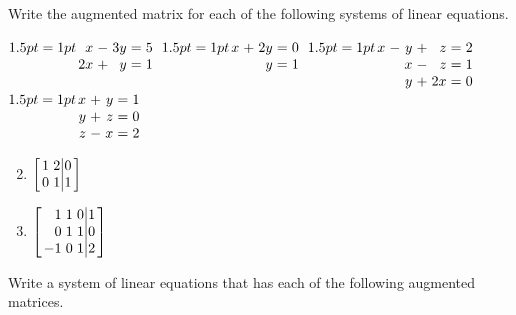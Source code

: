 \begin{multicols}{2}
\columnbreak
\begin{ex}
Write the augmented matrix for each of the following systems of linear equations.
\begin{exenumerate}
\exitem $\arraycolsep=1pt
\begin{array}[t]{rlrcr}
	x  & - & 3y & = & 5\\
	2x & + &  y & = & 1 
\end{array}$
\exitem $\arraycolsep=1pt
\begin{array}[t]{rlrcr}
	x & + & 2y & = & 0\\
	  &   &  y & = & 1
\end{array}$
\exitem $\arraycolsep=1pt
\begin{array}[t]{rlrlrcr}
	x & - & y & + & z & = & 2 \\
	  &   & x & - & z & = & 1 \\
	  &   & y & + &2x & = & 0
\end{array}$
\exitem $\arraycolsep=1pt
\begin{array}[t]{rlrcr}
	x & + & y & = & 1 \\
	y & + & z & = & 0 \\
	z & - & x & = & 2
\end{array}$
\end{exenumerate}
\begin{sol}
\begin{enumerate}[label={\alph*.}]
\setcounter{enumi}{1}
\item
$\leftB \begin{array}{rr|r}
	1 & 2 & 0 \\
	0 & 1 & 1
\end{array} \rightB$
\setcounter{enumi}{3}
\item $\leftB \begin{array}{rrr|r}
	1 & 1 & 0 & 1 \\
	0 & 1 & 1 & 0 \\
	-1 & 0 & 1 & 2
\end{array} \rightB$
\end{enumerate}
\end{sol}
\end{ex}

\begin{ex}
Write a system of linear equations that has each of the following augmented matrices.


\end{ex}
\end{multicols}
